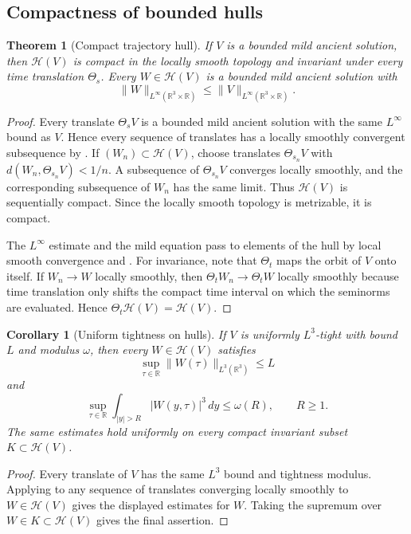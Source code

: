 \documentclass[11pt]{amsart}
\theoremstyle{plain}
\newtheorem{theorem}{Theorem}[section]
\newtheorem{corollary}[corollary]{Corollary}
\theoremstyle{definition}
\theoremstyle{remark}
\numberwithin{equation}{section}
\newcommand{\R}{\mathbb R}
\newcommand{\calH}{\mathcal H}
\begin{document}
\subsection{Compactness of bounded hulls}

\begin{theorem}[Compact trajectory hull]\label{p2:thm:compact-hull}
If \(V\) is a bounded mild ancient solution, then \(\calH(V)\) is compact in
the locally smooth topology and invariant under every time translation
\(\Theta_s\).  Every \(W\in\calH(V)\) is a bounded mild ancient solution with
\[
   \|W\|_{L^\infty(\R^3\times\R)}
   \le
   \|V\|_{L^\infty(\R^3\times\R)}.
\]
\end{theorem}

\begin{proof}
Every translate \(\Theta_sV\) is a bounded mild ancient solution with the same
\(L^\infty\) bound as \(V\).  Hence every sequence of translates has a
locally smoothly convergent subsequence by .
If \((W_n)\subset\calH(V)\), choose translates \(\Theta_{s_n}V\) with
\(d(W_n,\Theta_{s_n}V)<1/n\).  A subsequence of \(\Theta_{s_n}V\) converges
locally smoothly, and the corresponding subsequence of \(W_n\) has the same
limit.  Thus \(\calH(V)\) is sequentially compact.  Since the locally smooth
topology is metrizable, it is compact.

The \(L^\infty\) estimate and the mild equation pass to elements of the hull
by local smooth convergence and .  For invariance, note
that \(\Theta_t\) maps the orbit of \(V\) onto itself.  If \(W_n\to W\)
locally smoothly, then \(\Theta_tW_n\to\Theta_tW\) locally smoothly because
time translation only shifts the compact time interval on which the
seminorms are evaluated.  Hence \(\Theta_t\calH(V)=\calH(V)\).

\end{proof}

\begin{corollary}[Uniform tightness on hulls]\label{p2:cor:tightness-on-hulls}
If \(V\) is uniformly \(L^3\)-tight with bound \(L\) and modulus \(\omega\),
then every \(W\in\calH(V)\) satisfies
\[
   \sup_{\tau\in\R}\|W(\tau)\|_{L^3(\R^3)}\le L
\]
and
\[
   \sup_{\tau\in\R}\int_{|y|>R}|W(y,\tau)|^3\,dy\le\omega(R),
   \qquad R\ge1.
\]
The same estimates hold uniformly on every compact invariant subset
\(K\subset\calH(V)\).
\end{corollary}

\begin{proof}
Every translate of \(V\) has the same \(L^3\) bound and tightness modulus.
Applying  to any sequence of translates converging
locally smoothly to \(W\in\calH(V)\) gives the displayed estimates for \(W\).
Taking the supremum over \(W\in K\subset\calH(V)\) gives the final assertion.
\end{proof}
\end{document}
